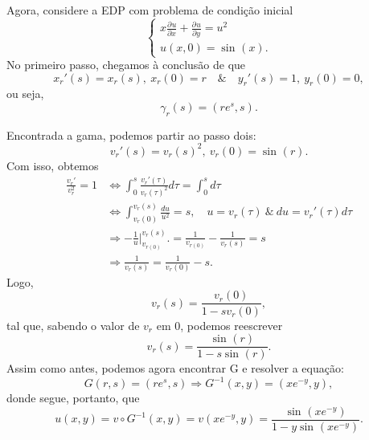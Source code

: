 \documentclass[../pde_notes.tex]{subfiles}
\begin{document}
\begin{example}
	Agora, considere a EDP com problema de condição inicial
	\[
		\left\{\begin{array}{ll}
			x \frac{\partial^{}u}{\partial x^{}} + \frac{\partial^{}u}{\partial y^{}} = u^{2} \\
			u(x, 0) = \sin^{}{(x)}.
		\end{array}\right.
	\]
	No primeiro passo, chegamos à conclusão de que
	\[
		x_{r}'(s) = x_{r}(s),\: x_{r}(0) = r \quad\&\quad y_{r}'(s) = 1,\: y_{r}(0) = 0,
	\]
	ou seja,
	\[
		\gamma_{r}(s) = (re^{s}, s).
	\]

	Encontrada a gama, podemos partir ao passo dois:
	\[
		v_{r}'(s) = v_{r}(s)^{2},\: v_{r}(0) = \sin^{}{(r)}.
	\]
	Com isso, obtemos
	\begin{align*}
		\frac{v_{r}'}{v_{r}^{2}} = 1 & \Longleftrightarrow \int_{0}^{s}\frac{v_{r}'(\tau )}{v_{r}(\tau )^{2}}d\tau = \int_{0}^{s}d\tau                          \\
		                             & \Longleftrightarrow \int_{v_{r}(0)}^{v_{r}(s)}\frac{du}{u^{2}} = s, \quad u = v_{r}(\tau )\:\&\: du = v_{r}'(\tau )d\tau \\
		                             & \Rightarrow -\frac{1}{u}\biggl|_{v_{r(0)}}^{v_{r}(s)}\biggr. = \frac{1}{v_{r(0)}} - \frac{1}{v_{r}(s)} = s               \\
		                             & \Rightarrow \frac{1}{v_{r}(s)} = \frac{1}{v_{r}(0)}-s.
	\end{align*}
	Logo,
	\[
		v_{r}(s) = \frac{v_{r}(0)}{1-sv_{r}(0)},
	\]
	tal que, sabendo o valor de \(v_{r}\) em 0, podemos reescrever
	\[
		v_{r}(s) = \frac{\sin^{}{(r)}}{1-s \sin^{}{(r)}}.
	\]
	Assim como antes, podemos agora encontrar G e resolver a equação:
	\[
		G(r, s) = (re^{s}, s) \Rightarrow G^{-1}(x, y) = (xe^{-y}, y),
	\]
	donde segue, portanto, que
	\[
		u(x, y) = v\circ G^{-1}(x, y) = v(xe^{-y}, y) = \frac{\sin^{}{(xe^{-y})}}{1-y\sin^{}{(xe^{-y})}}.
	\]
\end{example}
\end{document}
